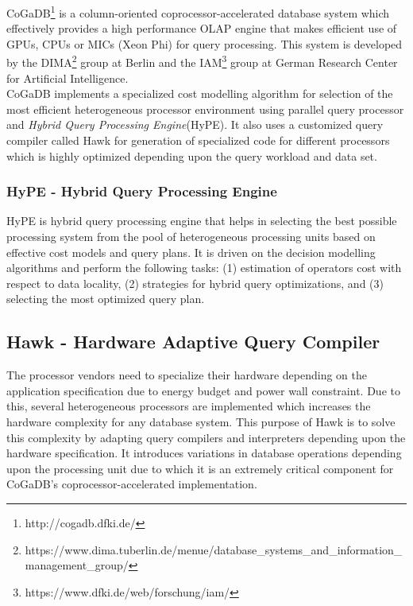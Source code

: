 CoGaDB\footnote{http://cogadb.dfki.de/} is a column-oriented coprocessor-accelerated database system which effectively provides a high performance OLAP engine\cite{cogadb_design_impl} that makes efficient use of GPUs, CPUs or MICs (Xeon Phi) for query processing. This system is developed by the DIMA\footnote{https://www.dima.tu\text{-}berlin.de/menue/database\_systems\_and\_information\_management\_group/} group at Berlin and the IAM\footnote{https://www.dfki.de/web/forschung/iam/} group at German Research Center for Artificial Intelligence.
\\
CoGaDB implements a specialized cost modelling algorithm for selection of the most efficient heterogeneous processor environment using parallel query processor and \emph{Hybrid Query Processing Engine}(HyPE)\cite{cogadb_hype}. It also uses a customized query compiler called Hawk\cite{cogadb_hawk} for generation of specialized code for different processors which is highly optimized depending upon the query workload and data set.

\subsubsection*{HyPE - Hybrid Query Processing Engine}
HyPE is hybrid query processing engine that helps in selecting the best possible processing system from the pool of heterogeneous processing units based on effective cost models and query plans. It is driven on the decision modelling algorithms and perform the following tasks\cite{cogadb_hype}: (1) estimation of operators cost with respect to data locality, (2) strategies for hybrid query optimizations, and (3) selecting the most optimized query plan.

\subsection*{Hawk - Hardware Adaptive Query Compiler}
The processor vendors need to specialize their hardware depending on the application specification due to energy budget and power wall\cite{microprocessors} constraint. Due to this, several heterogeneous processors are implemented which increases the hardware complexity for any database system. This purpose of Hawk\cite{cogadb_hawk} is to solve this complexity by adapting query compilers and interpreters depending upon the hardware specification. It introduces variations in database operations depending upon the processing unit due to which it is an extremely critical component for CoGaDB's coprocessor-accelerated implementation.